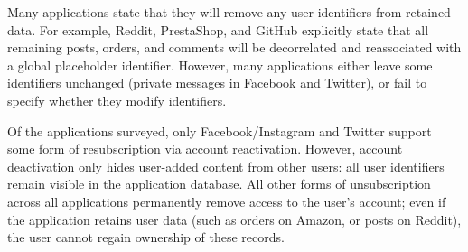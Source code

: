 Many applications state that they will remove any user identifiers from retained data.  For example,
Reddit, PrestaShop, and GitHub explicitly state that all remaining posts, orders, and comments will
be decorrelated and reassociated with a global placeholder identifier.  However, 
many applications either leave some identifiers unchanged (\eg private
messages in Facebook and Twitter), or fail to specify whether they modify identifiers. 

Of the applications surveyed, only Facebook/Instagram and Twitter support some form of
resubscription via account reactivation. However, account deactivation only hides user-added content from
other users: all user identifiers remain visible in the application database. All other forms
of unsubscription across all applications permanently remove access to the user's account; even if
the application retains user data (such as orders on Amazon, or posts on Reddit), the user cannot
regain ownership of these records.

